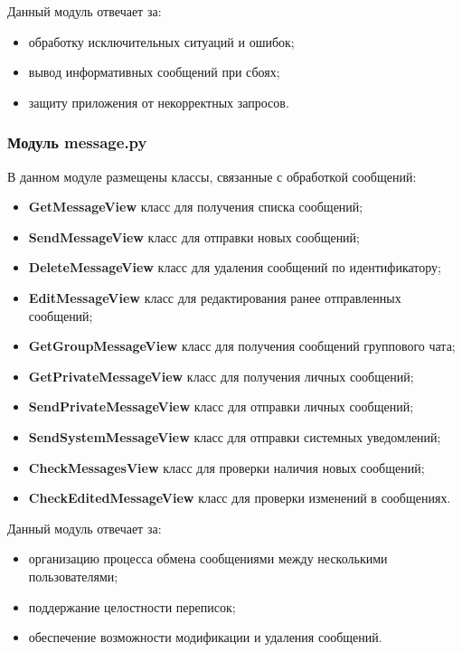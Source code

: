 Данный модуль отвечает за:

\begin{itemize}
	\item обработку исключительных ситуаций и ошибок;
	\item вывод информативных сообщений при сбоях;
	\item защиту приложения от некорректных запросов.
\end{itemize}

\subsubsection{Модуль message.py}
В данном модуле размещены классы, связанные с обработкой сообщений:
\begin{itemize}
	\item \textbf{GetMessageView} класс для получения списка сообщений;
	\item \textbf{SendMessageView} класс для отправки новых сообщений;
	\item \textbf{DeleteMessageView} класс для удаления сообщений по идентификатору;
	\item \textbf{EditMessageView} класс для редактирования ранее отправленных сообщений;
	\item \textbf{GetGroupMessageView} класс для получения сообщений группового чата;
	\item \textbf{GetPrivateMessageView} класс для получения личных сообщений;
	\item \textbf{SendPrivateMessageView} класс для отправки личных сообщений;
	\item \textbf{SendSystemMessageView} класс для отправки системных уведомлений;
	\item \textbf{CheckMessagesView} класс для проверки наличия новых сообщений;
	\item \textbf{CheckEditedMessageView} класс для проверки изменений в сообщениях.
\end{itemize}

Данный модуль отвечает за:

\begin{itemize}
	\item организацию процесса обмена сообщениями между несколькими пользователями;
	\item поддержание целостности переписок;
	\item обеспечение возможности модификации и удаления сообщений.
\end{itemize}

